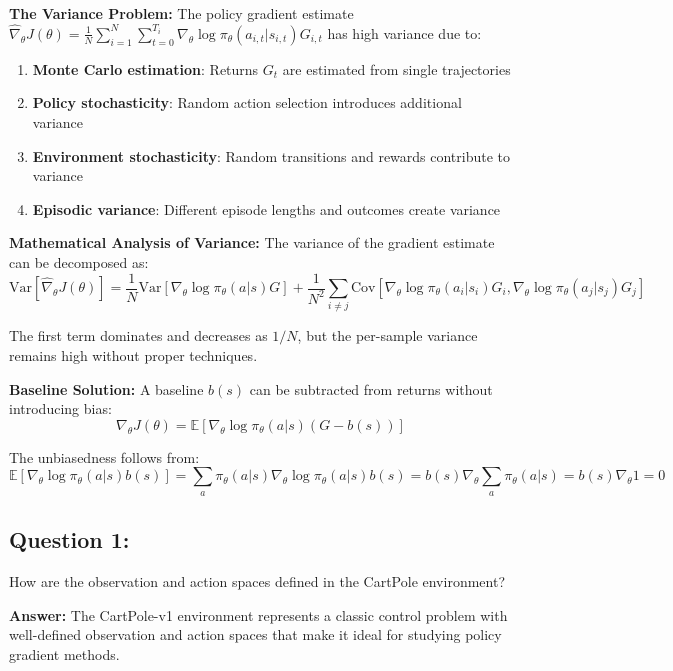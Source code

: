 \documentclass[12pt]{article}
\begin{document}
{{{\textbf{The Variance Problem:}
The policy gradient estimate $\hat{\nabla}_\theta J(\theta) = \frac{1}{N} \sum_{i=1}^{N} \sum_{t=0}^{T_i} \nabla_\theta \log \pi_\theta(a_{i,t}|s_{i,t}) G_{i,t}$ has high variance due to:

\begin{enumerate}
    \item \textbf{Monte Carlo estimation}: Returns $G_t$ are estimated from single trajectories
    \item \textbf{Policy stochasticity}: Random action selection introduces additional variance
    \item \textbf{Environment stochasticity}: Random transitions and rewards contribute to variance
    \item \textbf{Episodic variance}: Different episode lengths and outcomes create variance
\end{enumerate}

\textbf{Mathematical Analysis of Variance:}
The variance of the gradient estimate can be decomposed as:
$$\text{Var}[\hat{\nabla}_\theta J(\theta)] = \frac{1}{N} \text{Var}[\nabla_\theta \log \pi_\theta(a|s) G] + \frac{1}{N^2} \sum_{i \neq j} \text{Cov}[\nabla_\theta \log \pi_\theta(a_i|s_i) G_i, \nabla_\theta \log \pi_\theta(a_j|s_j) G_j]$$

The first term dominates and decreases as $1/N$, but the per-sample variance remains high without proper techniques.

\textbf{Baseline Solution:}
A baseline $b(s)$ can be subtracted from returns without introducing bias:
$$\nabla_\theta J(\theta) = \mathbb{E}[\nabla_\theta \log \pi_\theta(a|s) (G - b(s))]$$

The unbiasedness follows from:
$$\mathbb{E}[\nabla_\theta \log \pi_\theta(a|s) b(s)] = \sum_a \pi_\theta(a|s) \nabla_\theta \log \pi_\theta(a|s) b(s) = b(s) \nabla_\theta \sum_a \pi_\theta(a|s) = b(s) \nabla_\theta 1 = 0$$

\subsection{Question 1:}

How are the observation and action spaces defined in the CartPole environment?
\vspace*{0.3cm}

\textbf{Answer:} The CartPole-v1 environment represents a classic control problem with well-defined observation and action spaces that make it ideal for studying policy gradient methods.

}}}
\end{document}
